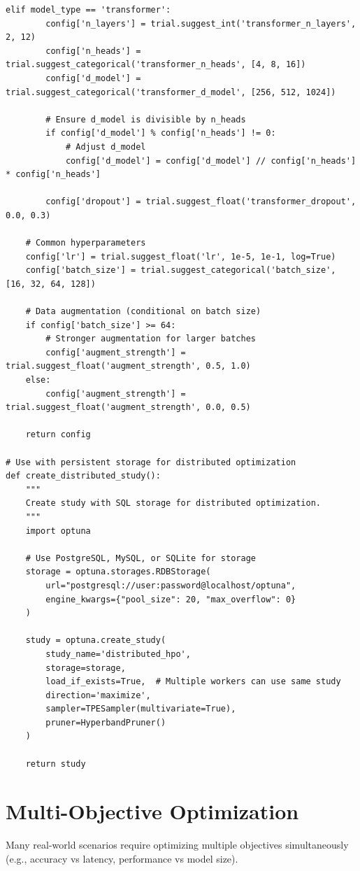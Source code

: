 \begin{lstlisting}[style=python, caption=Optuna with conditional search spaces and callbacks]
    elif model_type == 'transformer':
        config['n_layers'] = trial.suggest_int('transformer_n_layers', 2, 12)
        config['n_heads'] = trial.suggest_categorical('transformer_n_heads', [4, 8, 16])
        config['d_model'] = trial.suggest_categorical('transformer_d_model', [256, 512, 1024])

        # Ensure d_model is divisible by n_heads
        if config['d_model'] % config['n_heads'] != 0:
            # Adjust d_model
            config['d_model'] = config['d_model'] // config['n_heads'] * config['n_heads']

        config['dropout'] = trial.suggest_float('transformer_dropout', 0.0, 0.3)

    # Common hyperparameters
    config['lr'] = trial.suggest_float('lr', 1e-5, 1e-1, log=True)
    config['batch_size'] = trial.suggest_categorical('batch_size', [16, 32, 64, 128])

    # Data augmentation (conditional on batch size)
    if config['batch_size'] >= 64:
        # Stronger augmentation for larger batches
        config['augment_strength'] = trial.suggest_float('augment_strength', 0.5, 1.0)
    else:
        config['augment_strength'] = trial.suggest_float('augment_strength', 0.0, 0.5)

    return config

# Use with persistent storage for distributed optimization
def create_distributed_study():
    """
    Create study with SQL storage for distributed optimization.
    """
    import optuna

    # Use PostgreSQL, MySQL, or SQLite for storage
    storage = optuna.storages.RDBStorage(
        url="postgresql://user:password@localhost/optuna",
        engine_kwargs={"pool_size": 20, "max_overflow": 0}
    )

    study = optuna.create_study(
        study_name='distributed_hpo',
        storage=storage,
        load_if_exists=True,  # Multiple workers can use same study
        direction='maximize',
        sampler=TPESampler(multivariate=True),
        pruner=HyperbandPruner()
    )

    return study
\end{lstlisting}

\section{Multi-Objective Optimization}

Many real-world scenarios require optimizing multiple objectives simultaneously (e.g., accuracy vs latency, performance vs model size).

